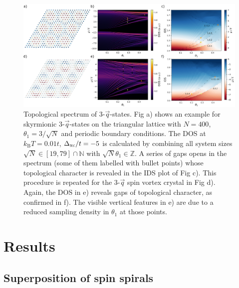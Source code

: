 \documentclass[
    10pt,
    aps,
    prb,
    twocolumn,
    floatfix,
    superscriptaddress,
]{revtex4-2}
\begin{document}
\begin{figure}[t]
 \centering
 \includegraphics[width=\linewidth]{../gfx/figure_02/figure_02.png}
 \caption{
     Topological spectrum of 3-$\vec{q}$-states.
     Fig a) shows an example for skyrmionic 3-$\vec{q}$-states on the triangular lattice with $N=400$, $\theta_1 = 3/\sqrt{N}$ and periodic boundary conditions.
     The DOS at $k_\mathrm{B}T = 0.01t$, $\Delta_\mathrm{xc} / t=-5$ is calculated by combining all system sizes $\sqrt{N} \in [19,79]\cap \mathbb{N}$ with  $\sqrt{N}\theta_1 \in \mathbb{Z}$.
     A series of gaps opens in the spectrum (some of them labelled with bullet points) whose topological character is revealed in the IDS plot of Fig c).
     This procedure is repeated for the 3-$\vec{q}$ spin vortex crystal in Fig d).
    Again, the DOS in e) reveals gaps of topological character, as confirmed in f).
    The visible vertical features in e) are due to a reduced sampling density in $\theta_1$ at those points. 
 }  
 \label{fig:three_q_states}
\end{figure}



\section{Results}
\subsection{Superposition of spin spirals}
\end{document}
